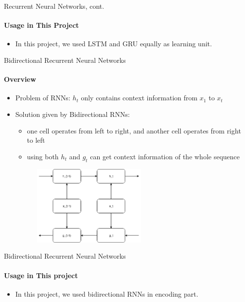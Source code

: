 \documentclass{beamer}
\begin{document}
\begin{frame}{Recurrent Neural Networks, cont.}\framesubtitle{Usage in This Project}
    \begin{itemize}
        \item In this project, we used LSTM and GRU equally as learning unit.
    \end{itemize}
\end{frame}

\begin{frame}{Bidirectional Recurrent Neural Networks}\framesubtitle{Overview }
    \begin{itemize}
        \item Problem of RNNs: $h_t$ only contains context information from $x_1$ to $x_t$
        \item Solution given by Bidirectional RNNs:
            \begin{itemize}
                \item one cell operates from left to right, and another cell operates from right to left
                \item using both $h_t$ and $g_t$ can get context information of the whole sequence
            \end{itemize}
             \begin{center}
                  \includegraphics[width=8cm, height=4cm]{figures/bidirectionalRnn.png}
            \end{center}
    \end{itemize}
\end{frame}

\begin{frame}{Bidirectional Recurrent Neural Networks}\framesubtitle{Usage in This project}
    \begin{itemize}
        \item In this project, we used bidirectional RNNs in encoding part.
    \end{itemize}
\end{frame}
\end{document}
